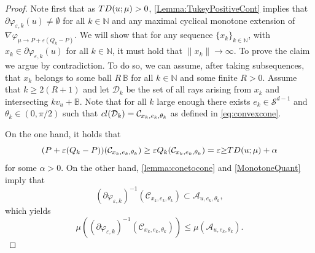 \documentclass[11pt]{article}
\newcommand{\N}{\mathbb{N}}
\newcommand{\eps}{\varepsilon}
\theoremstyle{plain}
\theoremstyle{definition}
\begin{document}
\begin{proof}
%
Note first that as ${\rm TD}(u;\mu)>0$, \autoref{Lemma:TukeyPositiveCont} implies that $ \partial\varphi_{\eps,k}(u) \neq \emptyset$ for all $k\in \N$ and  any maximal {  cyclical} monotone extension of $\nabla \varphi_{\mu\to P+\eps (Q_k-P)}$. 
We will show that for any sequence $
\{x_k\}_{k\in \N}$, with 
$ x_k \in \partial\varphi_{\eps,k}(u)$
for all $k\in \N$, it must hold that $ \|x_k\| \to \infty.$ 
To prove the claim we argue by contradiction. To do so, we can assume, after taking subsequences, that $x_k$ belongs to some ball $R\,\mathbb{B}$ for all $k\in \N$ and some finite $R>0$. %
Assume that $k\geq  2 (R+1) $ and let 
$ \mathcal{D}_k $ be the set of all rays arising from $ x_k $ and  {intersecting} $k v_u+\mathbb{B}$. Note that for all $k$ large enough there exists $e_k\in \mathcal{S}^{d-1}$ and $\theta_k\in (0,\pi/2)$ such that  $ {{\rm cl}}(\mathcal{D}_k) =\mathcal{C}_{x_k,e_k,\theta_k}$ as defined  in \eqref{eq:convexcone}.

On the one hand, it holds that  
\begin{equation}
    \label{eq:ToContradictlowerbound1}
    (P+\eps (Q_{k}-P))(\mathcal{C}_{x_k,e_k,\theta_k})\geq  \eps Q_{k}(\mathcal{C}_{x_k,e_k,\theta_k})= \eps  {\geq } {\rm TD}(u;\mu)+\alpha
\end{equation}
for some $\alpha>0$. On the other hand, \autoref{lemma:conetocone}  and \eqref{MonotoneQuant} imply that 
$$ (\partial \varphi_{\eps,k})^{-1}(\mathcal{C}_{x_k,e_k,\theta_k})\subset \mathcal{A}_{u,e_k,\theta_k}, $$
which yields
\begin{equation}
    \label{eq:ToContradictlowerbound2}
    \mu((\partial \varphi_{\eps,k})^{-1}(\mathcal{C}_{x_k,e_k,\theta_k})) {\leq } \mu(\mathcal{A}_{u,e_k,\theta_k}).
\end{equation}


\end{proof}
\end{document}
